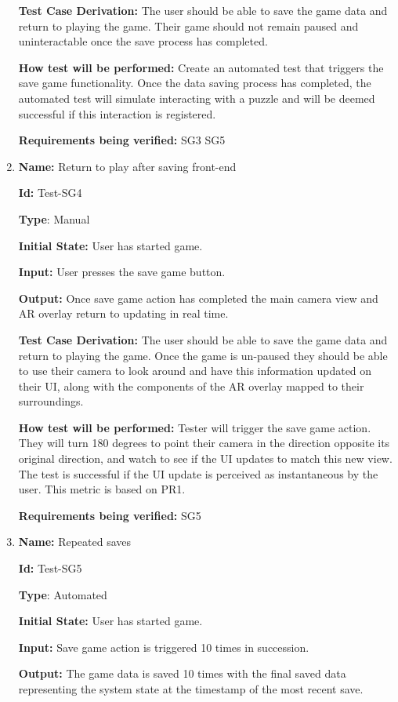 \documentclass[12pt, titlepage]{article}
\begin{document}
\begin{enumerate}
\textbf{Test Case Derivation:}
The user should be able to save the game data and return to playing the game. Their game should not remain paused and uninteractable once the save process has completed.

\textbf{How test will be performed:}
Create an automated test that triggers the save game functionality. Once the data saving process has completed, the automated test will simulate interacting with a puzzle and will be deemed successful if this interaction is registered.

\textbf{Requirements being verified: } SG3 SG5

\item{\textbf{Name:} Return to play after saving front-end}

\textbf{Id:} Test-SG4

\textbf{Type}: Manual

\textbf{Initial State:} User has started game.

\textbf{Input:} User presses the save game button.

\textbf{Output:} Once save game action has completed the main camera view and AR overlay return to updating in real time.

\textbf{Test Case Derivation:}
The user should be able to save the game data and return to playing the game. Once the game is un-paused they should be able to use their camera to look around and have this information updated on their UI, along with the components of the AR overlay mapped to their surroundings.

\textbf{How test will be performed:}
Tester will trigger the save game action. They will turn 180 degrees to point their camera in the direction opposite its original direction, and watch to see if the UI updates to match this new view. The test is successful if the UI update is perceived as instantaneous by the user. This metric is based on PR1.

\textbf{Requirements being verified: } SG5

\item{\textbf{Name:} Repeated saves}

\textbf{Id:} Test-SG5

\textbf{Type}: Automated

\textbf{Initial State:} User has started game.

\textbf{Input:} Save game action is triggered 10 times in succession.

\textbf{Output:} The game data is saved 10 times with the final saved data representing the system state at the timestamp of the most recent save.


\end{enumerate}
\end{document}
